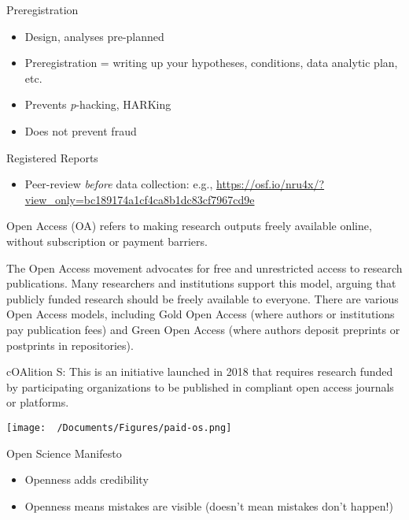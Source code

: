 \documentclass[
  ignorenonframetext,
  aspectratio=169,
]{beamer}
\providecommand{\tightlist}{%
  \setlength{\itemsep}{0pt}\setlength{\parskip}{0pt}}\usepackage{longtable,booktabs,array}
\begin{document}
\begin{frame}{Preregistration}
\label{preregistration}
\begin{itemize}
\tightlist
\item
  Design, analyses pre-planned
\item
  Preregistration = writing up your hypotheses, conditions, data
  analytic plan, etc.
\item
  Prevents \emph{p}-hacking, HARKing
\item
  Does not prevent fraud
\end{itemize}
\end{frame}

\begin{frame}{Registered Reports}
\label{registered-reports}
\begin{itemize}
\tightlist
\item
  Peer-review \emph{before} data collection: e.g.,
  \url{https://osf.io/nru4x/?view_only=bc189174a1cf4ca8b1dc83cf7967cd9e}
\end{itemize}
\end{frame}

\begin{frame}{}
\label{section-2}
Open Access (OA) refers to making research outputs freely available
online, without subscription or payment barriers.

The Open Access movement advocates for free and unrestricted access to
research publications. Many researchers and institutions support this
model, arguing that publicly funded research should be freely available
to everyone. There are various Open Access models, including Gold Open
Access (where authors or institutions pay publication fees) and Green
Open Access (where authors deposit preprints or postprints in
repositories).

cOAlition S: This is an initiative launched in 2018 that requires
research funded by participating organizations to be published in
compliant open access journals or platforms.
\end{frame}

\begin{frame}{}
\label{section-3}
\begin{center}
\texttt{[image: ~/Documents/Figures/paid-os.png]}
\end{center}
\end{frame}

\begin{frame}{Open Science Manifesto}
\label{open-science-manifesto}
\begin{itemize}
\tightlist
\item
  Openness adds credibility
\item
  Openness means mistakes are visible (doesn't mean mistakes don't
  happen!)
\end{itemize}
\end{frame}
\end{document}
